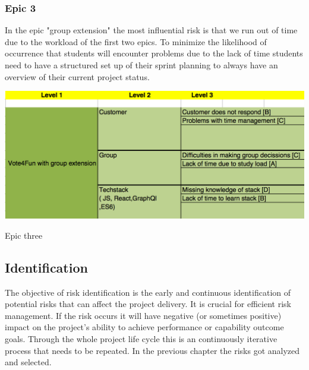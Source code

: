 \newpage
\subsubsection{Epic 3}
In the epic "group extension" the most influential risk is that we run out of time due to the workload of the first two epics.
\newline
To minimize the likelihood of occurrence that students will encounter problems due to the lack of time students need to have a structured set up of their sprint planning to always have an overview of their current project status.
\begin{table}[!ht]
  \includegraphics[width=\linewidth]{content/diagram/risk/groupextension.png}
  \caption{Epic three}
\end{table}

\subsection{Identification}
The objective of risk identification is the early and continuous identification of potential risks that can affect the project delivery. It is crucial for efficient risk management. If the risk occurs it will have negative (or sometimes positive) impact on the project's ability to achieve performance or capability outcome goals. Through the whole project life cycle this is an continuously iterative process that needs to be repeated. In the previous chapter the risks got analyzed and selected. 




